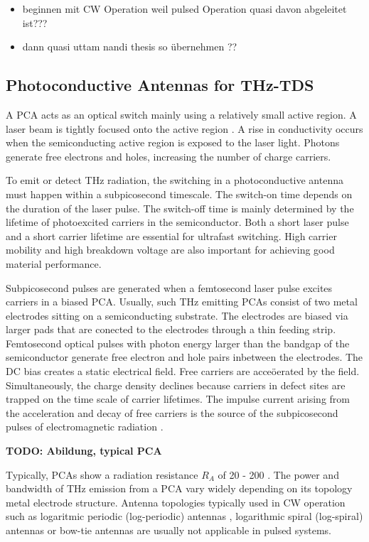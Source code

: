 \begin{itemize}
	\item beginnen mit CW Operation weil pulsed Operation quasi davon abgeleitet ist???
	\item dann quasi uttam nandi thesis so übernehmen ??
\end{itemize}

\subsection{Photoconductive Antennas for THz-TDS}
A PCA acts as an optical switch mainly using a relatively small active region. A laser beam is tightly focused onto the active region \cite{nandiErAsInAlGaAsPhotoconductors2021}. A rise in conductivity occurs when the semiconducting active region is exposed to the laser light. Photons generate free electrons and holes, increasing the number of charge carriers.

To emit or detect THz radiation, the switching in a photoconductive antenna must happen within a subpicosecond timescale. The switch-on time depends on the duration of the laser pulse. The switch-off time is mainly determined by the lifetime of photoexcited carriers in the semiconductor. Both a short laser pulse and a short carrier lifetime are essential for ultrafast switching. High carrier mobility and high breakdown voltage are also important for achieving good material performance.

Subpicosecond pulses are generated when a femtosecond laser pulse excites carriers in a biased PCA. Usually, such THz emitting PCAs consist of two metal electrodes sitting on a semiconducting substrate. The electrodes are biased via larger pads that are conected to the electrodes through a thin feeding strip. Femtosecond optical pulses with photon energy larger than the bandgap of the semiconductor generate free electron and hole pairs  inbetween the electrodes. The DC bias creates a static electrical field. Free carriers are acceöerated by the field. Simultaneously, the charge density declines because carriers in defect sites are trapped on the time scale of carrier lifetimes. The impulse current arising from the acceleration and decay of free carriers is the source of the subpicosecond pulses of electromagnetic radiation \cite{PrinciplesTerahertzScience2009}. 

\textbf{TODO: Abildung, typical PCA}

Typically, PCAs show a radiation resistance $R_A$ of \num{20} - \num{200} \si{\Omega}. The power and bandwidth of THz emission from a PCA vary widely depending on its topology metal electrode structure. Antenna topologies typically used in CW operation such as logaritmic periodic (log-periodic) antennas \cite{mendisTunableCWTHzSystem2004}, logarithmic spiral (log-spiral) \cite{linRoomtemperatureContinuouswaveTerahertz2025} antennas or bow-tie antennas \cite{PDFBowtieWideband} are usually not applicable in pulsed systems. 

